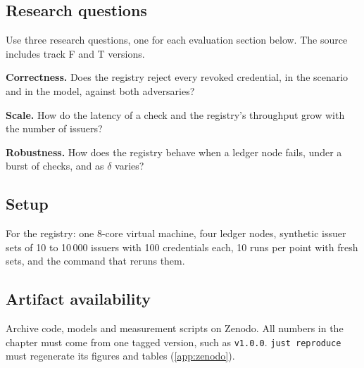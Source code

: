 \subsection[Research questions]{Research questions\skimmark}\label{app:chapters:research-questions}
Use three research questions, one for each evaluation section below. The source includes track F and T versions.
\begin{rqlist}
  \item\label{rq:guide:correct} \textbf{Correctness.} Does the registry reject every revoked credential, in the scenario and in the model, against both adversaries?
  \item\label{rq:guide:scale} \textbf{Scale.} How do the latency of a check and the registry's throughput grow with the number of issuers?
  \item\label{rq:guide:robust} \textbf{Robustness.} How does the registry behave when a ledger node fails, under a burst of checks, and as $\delta$ varies?
\end{rqlist}

\subsection{Setup}\label{app:chapters:setup}
For the registry: one 8-core virtual machine, four ledger nodes, synthetic issuer sets of 10 to 10\,000 issuers with 100 credentials each, 10 runs per point with fresh sets, and the command that reruns them.

\subsection{Artifact availability}\label{app:chapters:artifact-availability}
Archive code, models and measurement scripts on Zenodo. All numbers in the chapter must come from one tagged version, such as \texttt{v1.0.0}. \texttt{just reproduce} must regenerate its figures and tables (\cref{app:zenodo}).

